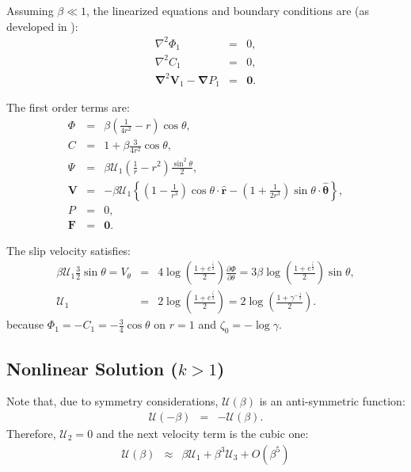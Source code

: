 \documentclass[final]{elsarticle}
\newcommand{\deriv}[2]{\frac{\partial #1}{\partial #2}}
\newcommand{\pars}[1]{\left(#1\right)}
\newcommand{\brcs}[1]{\left\{#1\right\}}
\newcommand\Laplacian{\nabla^2}
\newcommand\bnabla{\boldsymbol{\nabla}}
\newcommand\bLaplacian{\boldsymbol{\nabla}^2}
\newcommand\bV{\boldsymbol{V}}
\newcommand\bF{\boldsymbol{F}}
\newcommand\br{\boldsymbol{r}}
\newcommand\brhat{\hat{\br}}
\newcommand\btheta{\boldsymbol{\theta}}
\newcommand\bthetahat{\hat{\btheta}}
\newcommand\bzero{\boldsymbol{0}}
\newcommand\cU{\mathscr{U}}
\begin{document}
\begin{appendix}
Assuming $\beta \ll 1$, the linearized equations and boundary conditions are 
(as developed in \cite{yariv2010migration}):
\begin{eqnarray*}
\Laplacian \varPhi_1 &=& 0, \\
\Laplacian C_1 &=& 0, \\
\bLaplacian \bV_1 - \bnabla P_1 &=& \bzero.
\end{eqnarray*}

The first order terms are:
\begin{eqnarray*}
\varPhi &=& \beta \pars{\frac{1}{4r^2} - r}\cos\theta, \\
C &=& 1 + \beta \frac{3}{4r^2} \cos\theta, \\
\Psi &=& \beta \cU_1 \pars{\frac{1}{r} - r^2} \frac{\sin^2\theta}{2}, \\
\bV &=& -\beta \cU_1 \brcs{\pars{1 - \frac{1}{r^3}}\cos\theta \cdot \brhat - 
                               \pars{1 + \frac{1}{2r^3}} \sin\theta \cdot \bthetahat}, \\
P &=& 0, \\
\bF &=& \bzero.
\end{eqnarray*}

The slip velocity satisfies:
\begin{eqnarray*}
\beta \cU_1 \frac{3}{2} \sin\theta =
V_\theta &=& 4 \log \pars{\frac{1 + e ^ \frac{\zeta}{2}}{2}} \deriv{\varPhi}{\theta} 
=
 3 \beta \log \pars{\frac{1 + e ^ \frac{\zeta}{2}}{2}} \sin\theta, \\
\cU_1 &=& 2 \log \pars{\frac{1 + e ^ \frac{\zeta}{2}}{2}} 
       =  2 \log \pars{\frac{1 + \gamma ^ {-\frac{1}{2}}}{2}}.
\end{eqnarray*}
because $\varPhi_1 = -C_1 = -\frac{3}{4} \cos\theta$ on $r=1$
and $\zeta_0 = -\log\gamma$.

\subsection{Nonlinear Solution ($k > 1$)}
Note that, due to symmetry considerations, $\cU(\beta)$ is an anti-symmetric function:
\begin{eqnarray*}
\cU(-\beta) &=& -\cU(\beta).
\end{eqnarray*}
Therefore, $\cU_2 = 0$ and the next velocity term is the cubic one:
\begin{eqnarray*}
\cU(\beta) &\approx& \beta \cU_1 + \beta^3 \cU_3 + O(\beta^5)
\end{eqnarray*}


\end{appendix}
\end{document}
